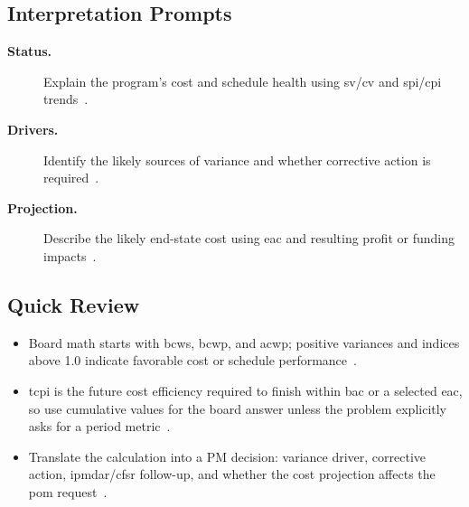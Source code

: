 \documentclass[../main.tex]{subfiles}
\begin{document}
\subsection{Interpretation Prompts}
\begin{description}
  \item[\textbf{Status.}] Explain the program's cost and schedule health using \ac{sv}/\ac{cv} and \ac{spi}/\ac{cpi} trends~\autocite{edo-3-6-3-evm-exercise-2025}.
  \item[\textbf{Drivers.}] Identify the likely sources of variance and whether corrective action is required~\autocite{edo-3-6-3-evm-exercise-2025}.
  \item[\textbf{Projection.}] Describe the likely end-state cost using \ac{eac} and resulting profit or funding impacts~\autocite{edo-3-6-3-evm-exercise-2025}.
\end{description}

\subsection{Quick Review}
\begin{itemize}
  \item Board math starts with \ac{bcws}, \ac{bcwp}, and \ac{acwp}; positive variances and indices above 1.0 indicate favorable cost or schedule performance~\autocite{edo-3-6-3-evm-exercise-2025,DoD-IPM-EVM-Definitions-2026}.
  \item \ac{tcpi} is the future cost efficiency required to finish within \ac{bac} or a selected \ac{eac}, so use cumulative values for the board answer unless the problem explicitly asks for a period metric~\autocite{DoD-IPM-EVM-Definitions-2026}.
  \item Translate the calculation into a PM decision: variance driver, corrective action, \ac{ipmdar}/\ac{cfsr} follow-up, and whether the cost projection affects the \ac{pom} request~\autocite{edo-3-6-3-evm-exercise-2025,DoD-IPM-Policy-Guidance-2026}.
\end{itemize}

\end{document}

